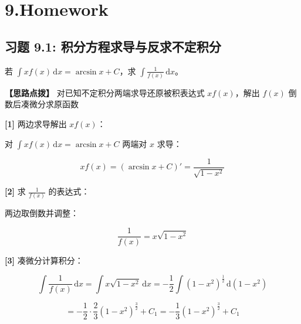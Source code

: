 \documentclass[11pt,a4paper,UTF8]{ctexart}
\begin{document}
\pagestyle{fancy}
\fancyhf{}
\fancyhead[R]{\small\color{TitlePurple}\nouppercase{\leftmark}}
\renewcommand{\headrulewidth}{0.5pt}

\tableofcontents
\newpage
{}


\section{9.Homework}


\subsection{习题 9.1: 积分方程求导与反求不定积分}

若 $\int xf(x)\,\mathrm{d}x = \arcsin x + C$，求 $\int \frac{1}{f(x)}\,\mathrm{d}x$。

\textbf{\color{DeepPurple}【思路点拨】} 对已知不定积分两端求导还原被积表达式 $xf(x)$，解出 $f(x)$ 倒数后凑微分求原函数


\begin{solbox}[分步推导与答题规范]
\textbf{[1]} 两边求导解出 $xf(x)$：

对 $\int xf(x)\,\mathrm{d}x = \arcsin x + C$ 两端对 $x$ 求导：


\begin{equation*}
xf(x) = (\arcsin x + C)' = \frac{1}{\sqrt{1-x^2}}
\end{equation*}


\textbf{[2]} 求 $\frac{1}{f(x)}$ 的表达式：

两边取倒数并调整：


\begin{equation*}
\frac{1}{f(x)} = x\sqrt{1-x^2}
\end{equation*}


\textbf{[3]} 凑微分计算积分：


\begin{equation*}
\int \frac{1}{f(x)}\,\mathrm{d}x = \int x\sqrt{1-x^2}\,\mathrm{d}x = -\frac{1}{2}\int (1-x^2)^{\frac{1}{2}}\,\mathrm{d}(1-x^2)
\end{equation*}



\begin{equation*}
= -\frac{1}{2} \cdot \frac{2}{3}(1-x^2)^{\frac{3}{2}} + C_1 = -\frac{1}{3}(1-x^2)^{\frac{3}{2}} + C_1
\end{equation*}

\end{solbox}
\end{document}
